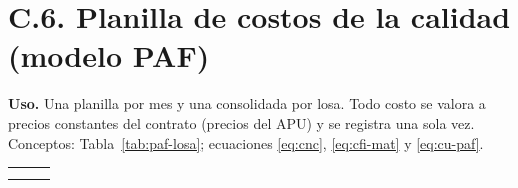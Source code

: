 \clearpage
\section*{C.6. Planilla de costos de la calidad (modelo PAF)}

{\small
\textbf{Uso.} Una planilla por mes y una consolidada por losa. Todo costo se valora a precios constantes del contrato (precios del APU) y se registra una sola vez. Conceptos: Tabla~\ref{tab:paf-losa}; ecuaciones \eqref{eq:cnc}, \eqref{eq:cfi-mat} y \eqref{eq:cu-paf}.\par}


{\footnotesize{}\renewcommand{\arraystretch}{1.3}
\noindent\begin{tabularx}{\linewidth}{@{}|L|L|L|@{}}
\hline
{} &  &  \\
 &  &  \\
\hline
\end{tabularx}\par}

